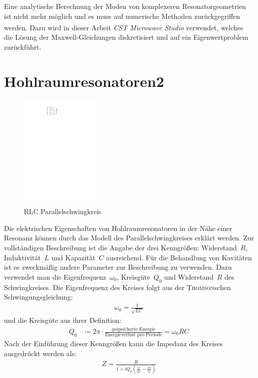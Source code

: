 \documentclass[11pt, a4paper]{scrbook}
\begin{document}
	Eine analytische Berechnung der Moden von komplexeren Resonatorgeometrien ist nicht mehr möglich und es muss auf numerische Methoden zurückgegriffen werden.
	Dazu wird in dieser Arbeit \emph{CST Microwave Studio\textsuperscript{\textregistered}} verwendet, welches die Lösung der Maxwell-Gleichungen diskretisiert und auf ein Eigenwertproblem zurückführt.
	
	\section{Hohlraumresonatoren2}
	\begin{figure}[h]
		\centering
		\includegraphics[width=0.35\textwidth]{./figures/RLC_circuit.pdf}
		\caption{RLC Parallelschwingkreis}
		\label{fig:rlc_circuit}
	\end{figure}
	Die elektrischen Eigenschaften von Hohlraumresonatoren in der Nähe einer Resonanz können durch das Modell des Parallelschwingkreises erklärt werden.
	Zur vollständigen Beschreibung ist die Angabe der drei Kenngrößen: Widerstand~$R$, Induktivität~$L$ und Kapazität~$C$ ausreichend.
	Für die Behandlung von Kavitäten ist es zweckmäßig andere Parameter zur Beschreibung zu verwenden.
	Dazu verwendet man die Eigenfrequenz~$\omega_0$, Kreisgüte~$Q_0$ und Widerstand~$R$ des Schwingkreises.
	Die Eigenfrequenz des Kreises folgt aus der \textsc{Thomson}schen Schwingungsgleichung:
	\begin{align}
		\omega_0 = \frac{1}{\sqrt{L C}}
	\end{align}
	und die Kreisgüte aus ihrer Definition:
	\begin{align}
		Q_0 &\coloneqq 2\pi \cdot \frac{\text{gespeicherte Energie}}{\text{Energieverlust pro Periode}} = \omega_0 R C
	\end{align}
	Nach der Einführung dieser Kenngrößen kann die Impedanz des Kreises ausgedrückt werden als:
	\begin{align}
		Z = \frac{R}{1 + i Q_0 \left( \frac{\omega}{\omega_0}  - \frac{\omega_0}{\omega}\right)}
	\end{align}
	
\end{document}
